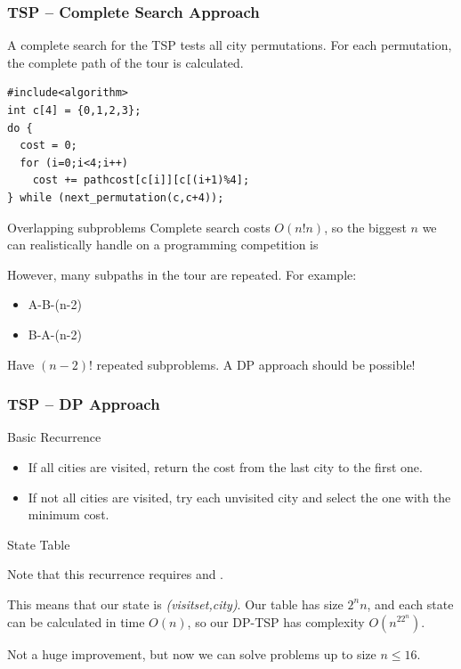 \documentclass{beamer}
\begin{document}
\begin{frame}
  \frametitle{TSP -- Complete Search Approach}

  {\smaller 
    A complete search for the TSP tests all city permutations. For each 
    permutation, the complete path of the tour is calculated.
\begin{exampleblock}{}
\begin{verbatim}
#include<algorithm>
int c[4] = {0,1,2,3};
do {
  cost = 0;
  for (i=0;i<4;i++)
    cost += pathcost[c[i]][c[(i+1)%4];
} while (next_permutation(c,c+4));
\end{verbatim}
\end{exampleblock}

  \begin{block}{Overlapping subproblems}
    Complete search costs $O(n!n)$, so the biggest $n$ we can
    realistically handle on a programming competition is 
    
    \medskip

    However, many subpaths in the tour are repeated. For example:
    \begin{itemize}
    \item A-B-(n-2)
    \item B-A-(n-2)
    \end{itemize}
    Have $(n-2)!$ repeated subproblems. A DP approach should be possible!    
  \end{block}
  }
  
\end{frame}

\begin{frame}
  \frametitle{TSP -- DP Approach}
  {\smaller
  \begin{block}{Basic Recurrence}
    \begin{itemize}
    \item If all cities are visited, return the cost from the last
      city to the first one.
    \item If not all cities are visited, try each unvisited city and
      select the one with the minimum cost.
    \end{itemize}
  \end{block}

  \begin{block}{State Table}

    Note that this recurrence requires  and .


    \bigskip

    This means that our state is \emph{(visitset,city)}. Our table has
    size $2^nn$, and each state can be calculated in time $O(n)$, so
    our DP-TSP has complexity $O(n^22^n)$. 

    \bigskip
    
    Not a huge improvement, but now we can solve problems up to size
    $n \leq 16$.

  \end{block}}
\end{frame}
\end{document}
